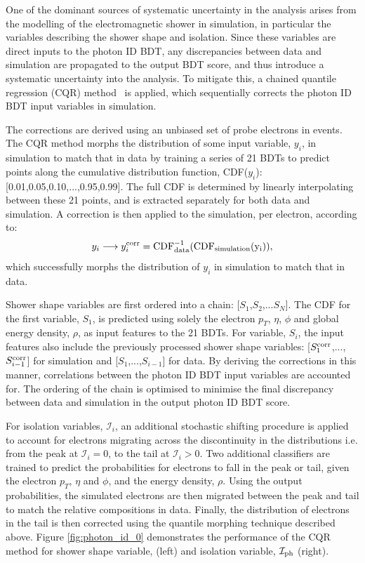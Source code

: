 One of the dominant sources of systematic uncertainty in the \Hgg analysis arises from the modelling of the electromagnetic shower in simulation, in particular the variables describing the shower shape and isolation. Since these variables are direct inputs to the photon ID BDT, any discrepancies between data and simulation are propagated to the output BDT score, and thus introduce a systematic uncertainty into the analysis. To mitigate this, a chained quantile regression (CQR) method~\cite{CQR} is applied, which sequentially corrects the photon ID BDT input variables in simulation. 

The corrections are derived using an unbiased set of probe electrons in \Zee events. The CQR method morphs the distribution of some input variable, $y_i$, in simulation to match that in data by training a series of 21 BDTs to predict points along the cumulative distribution function, CDF($y_i$): [0.01,0.05,0.10,...,0.95,0.99]. The full CDF is determined by linearly interpolating between these 21 points, and is extracted separately for both data and simulation. A correction is then applied to the simulation, per electron, according to:
\begin{equation}
    y_i \longrightarrow y_i^{\rm{corr}} = \rm{CDF}^{-1}_{\rm{data}}(\rm{CDF}_{\rm{simulation}}(y_i)),
\end{equation}
\noindent 
which successfully morphs the distribution of $y_i$ in simulation to match that in data. 

Shower shape variables are first ordered into a chain: [$S_1$,$S_2$,...$S_N$]. The CDF for the first variable, $S_1$, is predicted using solely the electron $p_T$, $\eta$, $\phi$ and global energy density, $\rho$, as input features to the 21 BDTs. For variable, $S_i$, the input features also include the previously processed shower shape variables: [$S^{\rm{corr}}_1$,...,$S^{\rm{corr}}_{i-1}$] for simulation and [$S_1$,...,$S_{i-1}$] for data. By deriving the corrections in this manner, correlations between the photon ID BDT input variables are accounted for. The ordering of the chain is optimised to minimise the final discrepancy between data and simulation in the output photon ID BDT score.

For isolation variables, $\mathcal{I}_i$, an additional stochastic shifting procedure is applied to account for electrons migrating across the discontinuity in the distributions i.e. from the peak at $\mathcal{I}_i=0$, to the tail at $\mathcal{I}_i>0$. Two additional classifiers are trained to predict the probabilities for electrons to fall in the peak or tail, given the electron $p_T$, $\eta$ and $\phi$, and the energy density, $\rho$. Using the output probabilities, the simulated electrons are then migrated between the peak and tail to match the relative compositions in data. Finally, the distribution of electrons in the tail is then corrected using the quantile morphing technique described above. Figure \ref{fig:photon_id_0} demonstrates the performance of the CQR method for shower shape variable, \RNINE (left) and isolation variable, $\mathcal{I}_{\rm{ph}}$ (right).

